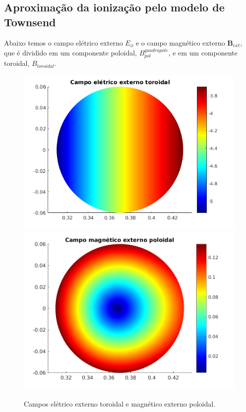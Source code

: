 \documentclass[12pt,oneside,a4paper]{abntex2}
\begin{document}
\subsection{Aproximação da ionização pelo modelo de Townsend}
\label{coeftrans}
\noindent Abaixo temos o campo elétrico externo $E_{\phi}$ e o campo magnético externo $\bm{B}_{ext}$, que é dividido em um componente poloidal, $B_{pol}^{quadrupole}$, e em um componente toroidal, $B_{toroidal}$. %
\begin{figure}[H]
\begin{center}
\includegraphics[scale=0.5]{../SImulacao_breakdown/PDE/Campoeleext.png} 
\includegraphics[scale=0.5]{../SImulacao_breakdown/PDE/CampoMagext2.png}
 \caption{Campos elétrico externo toroidal e magnético externo poloidal.}
\end{center}
\end{figure}
\end{document}
